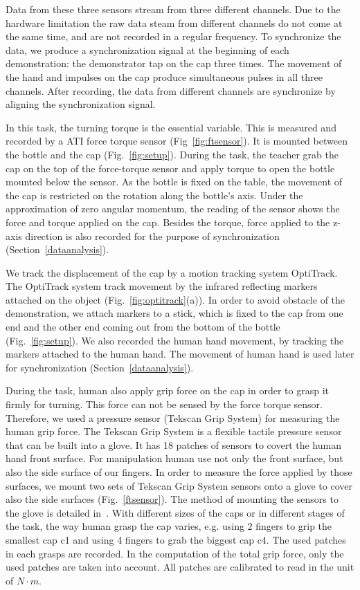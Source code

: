 Data from these three sensors stream from three different channels. Due to the hardware limitation the raw data steam from different channels do not come at the same time, and are not recorded in a regular frequency. To synchronize the data, we produce a synchronization signal at the beginning of each demonstration: the demonstrator tap on the cap three times. The movement of the hand and impulses on the cap produce simultaneous pulses in all three channels. After recording, the data from different channels are synchronize by aligning the synchronization signal.

In this task, the turning torque is the essential variable. This is measured and recorded by a ATI force torque sensor (Fig~\ref{fig:ftsensor}). It is mounted between the bottle and the cap (Fig.~\ref{fig:setup}). During the task, the teacher grab the cap on the top of the force-torque sensor and apply torque to open the bottle mounted below the sensor. As the bottle is fixed on the table, the movement of the cap is restricted on the rotation along the bottle's axis. Under the approximation of zero angular momentum, the reading of the sensor shows the force and torque applied on the cap. Besides the torque, force applied to the z-axis direction is also recorded for the purpose of synchronization (Section~\ref{dataanalysis}).

We track the displacement of the cap by a motion tracking system OptiTrack. The OptiTrack system track movement by the infrared reflecting markers attached on the object (Fig.~\ref{fig:optitrack}(a)). In order to avoid obstacle of the demonstration, we attach markers to a stick, which is fixed to the cap from one end and the other end coming out from the bottom of the bottle (Fig.~\ref{fig:setup}). We also recorded the human hand movement, by tracking the markers attached to the human hand. The movement of human hand is used later for synchronization (Section~\ref{dataanalysis}).

During the task, human also apply grip force on the cap in order to grasp it firmly for turning. This force can not be sensed by the force torque sensor. Therefore, we used a pressure sensor (Tekscan Grip System) for measuring the human grip force. The Tekscan Grip System is a flexible tactile pressure sensor that can be built into a glove. It has 18 patches of sensors to covert the human hand front surface. For manipulation human use not only the front surface, but also the side surface of our fingers. In order to measure the force applied by those surfaces, we mount two sets of Tekscan Grip System sensors onto a glove to cover also the side surfaces (Fig.~\ref{ftsensor}). The method of mounting the sensors to the glove is detailed in~\cite{deSouza2014}. With different sizes of the caps or in different stages of the task, the way human grasp the cap varies, e.g. using 2 fingers to grip the smallest cap c1 and using 4 fingers to grab the biggest cap c4. The used patches in each grasps are recorded. In the computation of the total grip force, only the used patches are taken into account. All patches are calibrated to read in the unit of $N{\cdot}m$.



